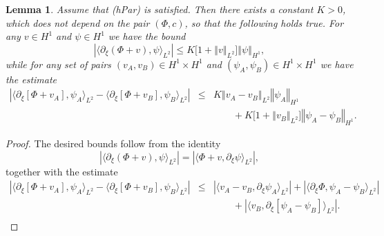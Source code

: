 \documentclass[10pt]{articleHJ}
\newcommand{\abs}[1]{\left\vert#1\right\vert}			%
\newcommand{\norm}[1]{\left\Vert#1\right\Vert}		%
\newtheorem{lem}[thm]{Lemma}
\numberwithin{equation}{section}
\begin{document}
\begin{lem}
\label{lem:prlm:bnds:deriv:u:vs:psi}
Assume that (hPar) is satisfied.
Then there exists a constant $K > 0$, which does not
depend on the pair $(\Phi, c)$, so that the following holds true.
For any $v \in H^1$
and $\psi \in H^1$
we have the bound
\begin{equation}
\abs{\langle \partial_\xi (\Phi + v) , \psi \rangle_{L^2} }
\le K \big[ 1 + \norm{v}_{L^2} \big] \norm{\psi}_{H^1},
\end{equation}
while for any set of pairs
$(v_A, v_B) \in H^1 \times H^1$
and $(\psi_A, \psi_B) \in H^1 \times H^1$
we have the estimate
\begin{equation}
\begin{array}{lcl}
\abs{\langle \partial_\xi [\Phi + v_A] , \psi_A \rangle_{L^2}
 - \langle \partial_\xi [\Phi + v_B] , \psi_B \rangle_{L^2}
}
& \le &  K\norm{v_A - v_B}_{L^2 } \norm{\psi_A}_{H^1}
\\[0.2cm]
& & \qquad
  + K\big[1 + \norm{v_B}_{L^2} \big] \norm{\psi_A-\psi_B}_{H^1}.
\end{array}
\end{equation}
\end{lem}
\begin{proof}
The desired bounds follow
from the identity
\begin{equation}
\abs{\langle \partial_\xi (\Phi + v) , \psi \rangle_{L^2} }
= \abs{\langle \Phi + v , \partial_\xi \psi \rangle_{L^2} } ,
\end{equation}
together with
the estimate
\begin{equation}
\begin{array}{lcl}
\abs{\langle \partial_\xi [\Phi + v_A] , \psi_A \rangle_{L^2}
 - \langle \partial_\xi [\Phi + v_B] , \psi_B \rangle_{L^2}
}
& \le & \abs{\langle v_A - v_B , \partial_\xi \psi_A \rangle_{L^2} }
+ \abs{ \langle \partial_\xi \Phi , \psi_A - \psi_B \rangle_{L^2} }
\\[0.2cm]
& & \qquad
+ \abs{ \langle  v_B , \partial_{\xi} [\psi_A - \psi_B]
  \rangle_{L^2} } .
\\[0.2cm]
\end{array}
\end{equation}
\end{proof}
\end{document}
